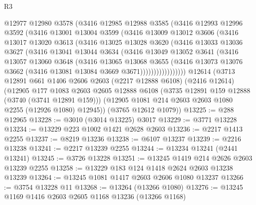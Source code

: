 \begin{lexlean}{R3}
\begin{coremodule}
            @12977
            @12980
            @3578
            (@3416
              @12985
              @12988
              @3585
              (@3416
                @12993
                @12996
                @3592
                (@3416
                  @13001
                  @13004
                  @3599
                  (@3416
                    @13009
                    @13012
                    @3606
                    (@3416
                      @13017
                      @13020
                      @3613
                      (@3416
                        @13025
                        @13028
                        @3620
                        (@3416
                          @13033
                          @13036
                          @3627
                          (@3416
                            @13041
                            @13044
                            @3634
                            (@3416
                              @13049
                              @13052
                              @3641
                              (@3416
                                @13057
                                @13060
                                @3648
                                (@3416
                                  @13065
                                  @13068
                                  @3655
                                  (@3416
                                    @13073
                                    @13076
                                    @3662
                                    (@3416 @13081 @13084 @3669 @3671)))))))))))))))))
    @12614
    (@3713
      @12891
      @661
      @1406
      @2606
      @2603
      (@2217 @12888 @6108)
      (@2416 @12614)
      (@12905
        @177
        @1083
        @2603
        @2605
        @12888
        @6108
        (@3735 @12891 @159 @12888 (@3740 (@3741 @12891 @159)))
        (@12905 @1081 @214 @2603 @2603 @1080 @2255 (@12926 @1080) @12945))
      (@3765 @12612 @1079))
@13225 := @288 @12965
@13228 := @3010 (@3014 @13225) @3017
@13229 := @3771 @13228
@13234 := @13229 @223 @1002 @1421 @2628 @2603
@13236 := @2217 @1413 @2255
@13237 := @8219 @13236
@13238 := @6107 @13237
@13239 := @2216 @13238
@13241 := @2217 @13239 @2255
@13244 := @13234 @13241 (@2441 @13241)
@13245 := @3726 @13228
@13251 := @13245 @1419 @214 @2626 @2603 @13239 @2255
@13258 := @13229 @183 @124 @1418 @2624 @2603 @13238 @13239
@13264 := @13245 @1081 @1417 @2603 @2606 @1080 @13237
@13266 := @3754 @13228 @11
@13268 := @13264 (@13266 @1080)
@13276 := @13245 @1169 @1416 @2603 @2605 @1168 @13236 (@13266 @1168)

\end{coremodule}
\end{lexlean}
